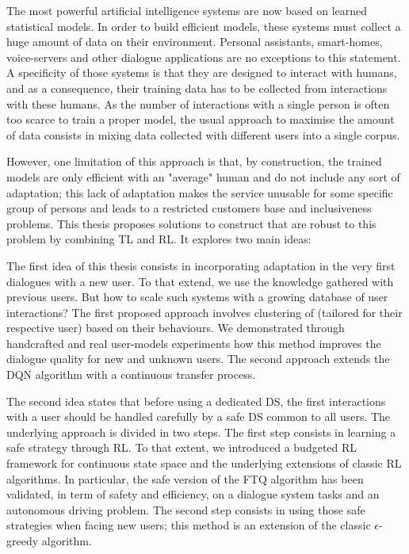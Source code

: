 The most powerful artificial intelligence systems are now  based on learned statistical models. In order to build efficient models, these systems must collect a huge amount of data on their environment.
%
Personal assistants, smart-homes, voice-servers and other dialogue applications are no exceptions to this statement.
%
A specificity of those systems is that they are designed to interact with humans, and as a consequence, their training data has to be collected from interactions with these humans. 
As the number of interactions with a single person is often too scarce to train a proper model, the usual approach to maximise the amount of data consists in mixing data collected with different users into a single corpus.

However, one limitation of this approach is that, by construction, the trained models are only efficient with an "average" human and do not include any sort of adaptation; this lack of adaptation makes the service unusable for some specific group of persons and leads to a restricted customers base and inclusiveness problems.
%
This thesis proposes solutions to construct  that are robust to this problem by combining \acrlong{TL} and \acrlong{RL}. It explores two main ideas:

The first idea of this thesis consists in incorporating adaptation in the very first dialogues with a new user. To that extend, we use the knowledge gathered with previous users. But how to scale such systems with a growing database of user interactions? The first proposed approach involves clustering of  (tailored for their respective user) based on their behaviours. We demonstrated through handcrafted and real user-models experiments how this method improves the dialogue quality for new and unknown users. The second approach extends the \acrlong{DQN} algorithm with a continuous transfer process. %

The second idea states that before using a dedicated \acrlong{DS}, the first interactions with a user should be handled carefully by a safe \acrlong{DS} common to all users. The underlying approach is divided in two steps. The first step consists in learning a safe strategy through \acrlong{RL}. To that extent, we introduced a budgeted \acrlong{RL} framework for continuous state space and the underlying extensions of classic \acrlong{RL} algorithms. In particular, the safe version of the \acrlong{FTQ} algorithm has been validated, in term of safety and efficiency, on a dialogue system tasks and an autonomous driving problem. The second step consists in using those safe strategies when facing new users; this method is an extension of the classic $\epsilon$-greedy algorithm. %

